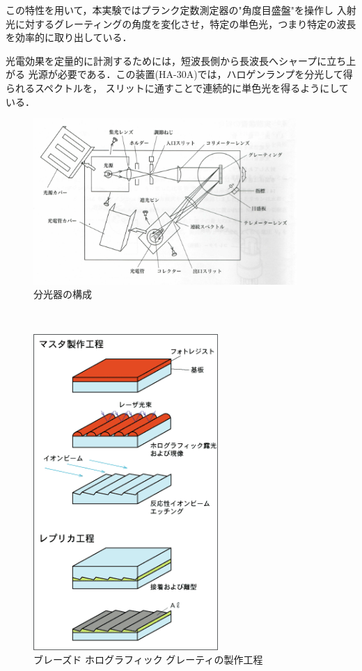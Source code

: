 \documentclass[11pt,a4paper]{jsarticle}
\begin{document}
			この特性を用いて，本実験ではプランク定数測定器の"角度目盛盤"を操作し
			入射光に対するグレーティングの角度を変化させ，特定の単色光，つまり特定の波長を効率的に取り出している．
			\par 光電効果を定量的に計測するためには，短波長側から長波長へシャープに立ち上がる
			光源が必要である．この装置(HA-30A)では，ハロゲンランプを分光して得られるスペクトルを，
			スリットに通すことで連続的に単色光を得るようにしている．
				\begin{figure}
							\begin{center}
								\includegraphics[width=100mm]{fig6.png}
							\end{center}
							\caption{分光器の構成 \cite{レタス}}
							\label{分光器の構成}
						\end{figure}　
				\begin{figure}
						\begin{center}
							\includegraphics[width=70mm]{zu_01.png}
						\end{center}
						\caption{ブレーズド ホログラフィック グレーティの製作工程
						\cite{島津回折格子}}
						\label{ホログラフィックグレーティングの製造工程}
					\end{figure}　
\end{document}
